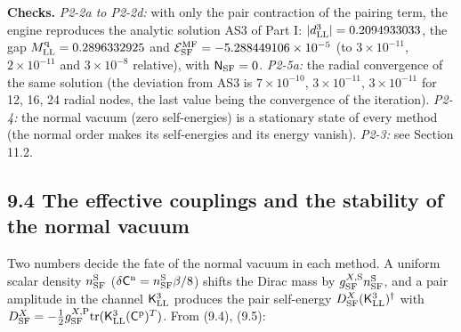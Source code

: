 \documentclass[
  10pt,
]{article}
\begin{document}
\textbf{Checks.} \emph{P2-2a to P2-2d:} with only the pair contraction
of the pairing term, the engine reproduces the analytic solution AS3 of
Part I: \(\lvert d^3_{\rm LL}\rvert=0.2094933033\), the gap
\(M^{\rm q}_{\rm LL}=0.2896332925\) and
\(\mathcal E^{\rm MF}_{\rm SF}=-5.288449106\times10^{-5}\) (to
\(3\times10^{-11}\), \(2\times10^{-11}\) and \(3\times10^{-8}\)
relative), with \(\mathsf N_{\rm SF}=0\). \emph{P2-5a:} the radial
convergence of the same solution (the deviation from AS3 is
\(7\times10^{-10}\), \(3\times10^{-11}\), \(3\times10^{-11}\) for 12,
16, 24 radial nodes, the last value being the convergence of the
iteration). \emph{P2-4:} the normal vacuum (zero self-energies) is a
stationary state of every method (the normal order makes its
self-energies and its energy vanish). \emph{P2-3:} see Section 11.2.

\hypertarget{the-effective-couplings-and-the-stability-of-the-normal-vacuum}{%
\subsection{9.4 The effective couplings and the stability of the normal
vacuum}\label{the-effective-couplings-and-the-stability-of-the-normal-vacuum}}

Two numbers decide the fate of the normal vacuum in each method. A
uniform scalar density \(n^{\rm S}_{\rm SF}\)
(\(\delta\mathsf C^{\rm n}=n^{\rm S}_{\rm SF}\beta/8\)) shifts the Dirac
mass by \(g^{X,{\rm S}}_{\rm SF}n^{\rm S}_{\rm SF}\), and a pair
amplitude in the channel \(\mathsf K^3_{\rm LL}\) produces the pair
self-energy \(D^X_{\rm SF}(\mathsf K^3_{\rm LL})^\dagger\) with
\(D^X_{\rm SF}=-\tfrac12g^{X,{\rm P}}_{\rm SF}\mathrm{tr}(\mathsf K^3_{\rm LL}(\mathsf C^{\rm p})^T)\).
From (9.4), (9.5):
\end{document}
